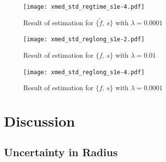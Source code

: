 \documentclass[iop,numberedappendix,apj,]{emulateapj}
\def\fast{\tilde f}
\begin{document}
\begin{figure}[!htbp]
    \begin{center}
\texttt{[image: xmed\_std\_regtime\_s1e-4.pdf]}
    \end{center}
    \caption{Result of estimation for $\{ \fast,\,s\}$ with $\lambda = 0.0001$}
\label{fig:shrinkwrap}
\end{figure}


\begin{figure}[!htbp]
    \begin{center}
\texttt{[image: xmed\_std\_reglong\_s1e-2.pdf]}
    \end{center}
    \caption{Result of estimation for $\{ f,\,s\}$ with $\lambda = 0.01$}
\label{fig:shrinkwrap}
\end{figure}


\begin{figure}[!htbp]
    \begin{center}
\texttt{[image: xmed\_std\_reglong\_s1e-4.pdf]}
    \end{center}
    \caption{Result of estimation for $\{ f,\,s\}$ with $\lambda = 0.0001$}
\label{fig:shrinkwrap}
\end{figure}




\clearpage


\section{Discussion}
\label{s:discussion}


\subsection{Uncertainty in Radius}
\label{ss:radius}
\end{document}
